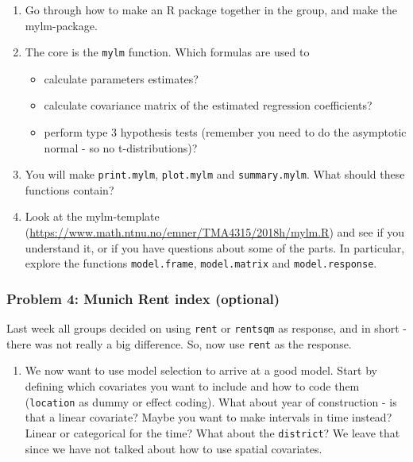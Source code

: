 \documentclass[
]{article}
\providecommand{\tightlist}{%
  \setlength{\itemsep}{0pt}\setlength{\parskip}{0pt}}
\begin{document}
\begin{enumerate}
\def\labelenumi{\arabic{enumi}.}
\tightlist
\item
  Go through how to make an R package together in the group, and make
  the mylm-package.
\item
  The core is the \texttt{mylm} function. Which formulas are used to

  \begin{itemize}
  \tightlist
  \item
    calculate parameters estimates?
  \item
    calculate covariance matrix of the estimated regression
    coefficients?
  \item
    perform type 3 hypothesis tests (remember you need to do the
    asymptotic normal - so no t-distributions)?
  \end{itemize}
\item
  You will make \texttt{print.mylm}, \texttt{plot.mylm} and
  \texttt{summary.mylm}. What should these functions contain?
\item
  Look at the mylm-template
  (\url{https://www.math.ntnu.no/emner/TMA4315/2018h/mylm.R}) and see if
  you understand it, or if you have questions about some of the parts.
  In particular, explore the functions \texttt{model.frame},
  \texttt{model.matrix} and \texttt{model.response}.
\end{enumerate}

\hypertarget{problem-4-munich-rent-index-optional}{%
\subsubsection{Problem 4: Munich Rent index
(optional)}\label{problem-4-munich-rent-index-optional}}

Last week all groups decided on using \texttt{rent} or \texttt{rentsqm}
as response, and in short - there was not really a big difference. So,
now use \texttt{rent} as the response.

\begin{enumerate}
\def\labelenumi{\arabic{enumi}.}
\tightlist
\item
  We now want to use model selection to arrive at a good model. Start by
  defining which covariates you want to include and how to code them
  (\texttt{location} as dummy or effect coding). What about year of
  construction - is that a linear covariate? Maybe you want to make
  intervals in time instead? Linear or categorical for the time? What
  about the \texttt{district}? We leave that since we have not talked
  about how to use spatial covariates.
\end{enumerate}
\end{document}

